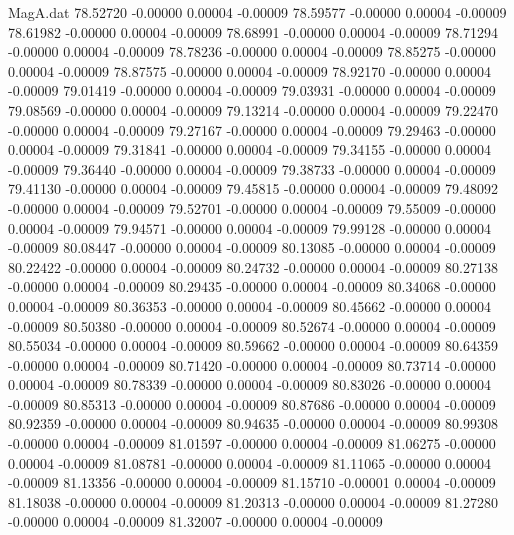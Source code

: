 \begin{filecontents}{MagA.dat}
  78.52720   -0.00000    0.00004   -0.00009
  78.59577   -0.00000    0.00004   -0.00009
  78.61982   -0.00000    0.00004   -0.00009
  78.68991   -0.00000    0.00004   -0.00009
  78.71294   -0.00000    0.00004   -0.00009
  78.78236   -0.00000    0.00004   -0.00009
  78.85275   -0.00000    0.00004   -0.00009
  78.87575   -0.00000    0.00004   -0.00009
  78.92170   -0.00000    0.00004   -0.00009
  79.01419   -0.00000    0.00004   -0.00009
  79.03931   -0.00000    0.00004   -0.00009
  79.08569   -0.00000    0.00004   -0.00009
  79.13214   -0.00000    0.00004   -0.00009
  79.22470   -0.00000    0.00004   -0.00009
  79.27167   -0.00000    0.00004   -0.00009
  79.29463   -0.00000    0.00004   -0.00009
  79.31841   -0.00000    0.00004   -0.00009
  79.34155   -0.00000    0.00004   -0.00009
  79.36440   -0.00000    0.00004   -0.00009
  79.38733   -0.00000    0.00004   -0.00009
  79.41130   -0.00000    0.00004   -0.00009
  79.45815   -0.00000    0.00004   -0.00009
  79.48092   -0.00000    0.00004   -0.00009
  79.52701   -0.00000    0.00004   -0.00009
  79.55009   -0.00000    0.00004   -0.00009
  79.94571   -0.00000    0.00004   -0.00009
  79.99128   -0.00000    0.00004   -0.00009
  80.08447   -0.00000    0.00004   -0.00009
  80.13085   -0.00000    0.00004   -0.00009
  80.22422   -0.00000    0.00004   -0.00009
  80.24732   -0.00000    0.00004   -0.00009
  80.27138   -0.00000    0.00004   -0.00009
  80.29435   -0.00000    0.00004   -0.00009
  80.34068   -0.00000    0.00004   -0.00009
  80.36353   -0.00000    0.00004   -0.00009
  80.45662   -0.00000    0.00004   -0.00009
  80.50380   -0.00000    0.00004   -0.00009
  80.52674   -0.00000    0.00004   -0.00009
  80.55034   -0.00000    0.00004   -0.00009
  80.59662   -0.00000    0.00004   -0.00009
  80.64359   -0.00000    0.00004   -0.00009
  80.71420   -0.00000    0.00004   -0.00009
  80.73714   -0.00000    0.00004   -0.00009
  80.78339   -0.00000    0.00004   -0.00009
  80.83026   -0.00000    0.00004   -0.00009
  80.85313   -0.00000    0.00004   -0.00009
  80.87686   -0.00000    0.00004   -0.00009
  80.92359   -0.00000    0.00004   -0.00009
  80.94635   -0.00000    0.00004   -0.00009
  80.99308   -0.00000    0.00004   -0.00009
  81.01597   -0.00000    0.00004   -0.00009
  81.06275   -0.00000    0.00004   -0.00009
  81.08781   -0.00000    0.00004   -0.00009
  81.11065   -0.00000    0.00004   -0.00009
  81.13356   -0.00000    0.00004   -0.00009
  81.15710   -0.00001    0.00004   -0.00009
  81.18038   -0.00000    0.00004   -0.00009
  81.20313   -0.00000    0.00004   -0.00009
  81.27280   -0.00000    0.00004   -0.00009
  81.32007   -0.00000    0.00004   -0.00009

\end{filecontents}
